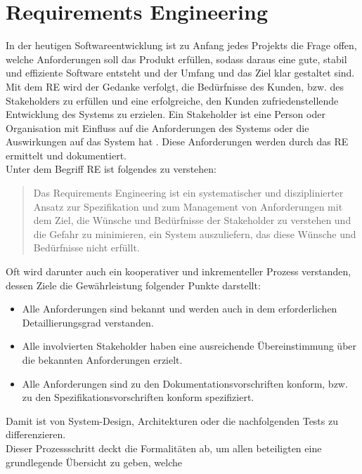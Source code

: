\section{Requirements Engineering}
\label{sec:requirementsengineering}
    In der heutigen Softwareentwicklung ist zu Anfang jedes Projekts die Frage offen, welche Anforderungen soll das 
    Produkt erfüllen, sodass daraus eine gute, stabil und effiziente Software entsteht und der Umfang und das Ziel 
    klar gestaltet sind. Mit dem \acl{RE} wird der Gedanke verfolgt, die Bedürfnisse des Kunden, bzw. des Stakeholders 
    zu erfüllen und eine erfolgreiche, den Kunden zufriedenstellende Entwicklung des Systems zu erzielen. Ein Stakeholder 
    ist eine Person oder Organisation mit Einfluss auf die Anforderungen des Systems oder die Auswirkungen auf das System 
    hat \cite{pohl2021basiswissen}.
    Diese Anforderungen werden durch das \acl{RE} ermittelt und dokumentiert. 
    \\
    \linebreak
    Unter dem Begriff \ac{RE} ist folgendes zu verstehen: 
    \begin{quote}
        Das Requirements Engineering ist ein systematischer und disziplinierter Ansatz zur Spezifikation und zum 
        Management von Anforderungen mit dem Ziel, die Wünsche und Bedürfnisse der Stakeholder zu verstehen und 
        die Gefahr zu minimieren, ein System auszuliefern, das diese Wünsche und Bedürfnisse nicht erfüllt. \cite{pohl2021basiswissen}
    \end{quote}
    Oft wird darunter auch ein kooperativer und inkrementeller Prozess verstanden, dessen Ziele die Gewährleistung 
    folgender Punkte darstellt:
    \begin{itemize}
        \item Alle Anforderungen sind bekannt und werden auch in dem erforderlichen Detaillierungsgrad verstanden.
        \item Alle involvierten Stakeholder haben eine ausreichende Übereinstimmung über die bekannten Anforderungen erzielt.
        \item Alle Anforderungen sind zu den Dokumentationsvorschriften konform, bzw. zu den Spezifikationsvorschriften konform spezifiziert.
    \end{itemize}
    Damit ist von System-Design, Architekturen oder die nachfolgenden Tests zu differenzieren. 
    \\
    Dieser Prozessschritt deckt die Formalitäten ab, um allen beteiligten eine grundlegende Übersicht zu geben, welche 

